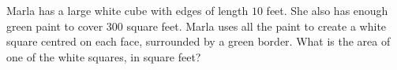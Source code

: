 Marla has a large white cube with edges of length $10$ feet. She also has enough green paint to cover $300$ square feet. Marla uses all the paint to create a white square centred on each face, surrounded by a green border. What is the area of one of the white squares, in square feet?
